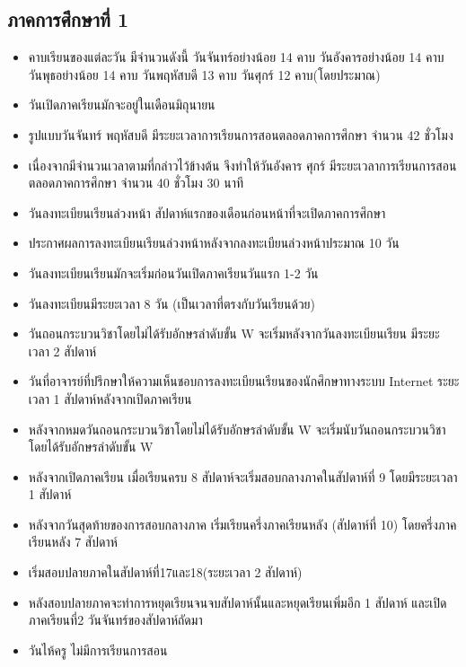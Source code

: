 \subsection{ภาคการศึกษาที่ 1}
 
\begin{itemize}
  \item   คาบเรียนของแต่ละวัน มีจำนวนดังนี้ วันจันทร์อย่างน้อย 14 คาบ วันอังคารอย่างน้อย 14 คาบ วันพุธอย่างน้อย 14 คาบ วันพฤหัสบดี 13 คาบ วันศุกร์ 12 คาบ(โดยประมาณ)  
  \item วันเปิดภาคเรียนมักจะอยู่ในเดือนมิถุนายน
  \item รูปแบบวันจันทร์ พฤหัสบดี มีระยะเวลาการเรียนการสอนตลอดภาคการศึกษา จำนวน 42 ชั่วโมง
  \item เนื่องจากมีจำนวนเวลาตามที่กล่าวไว้ข้างต้น จึงทำให้วันอังคาร ศุกร์ มีระยะเวลาการเรียนการสอนตลอดภาคการศึกษา จำนวน 40 ชั่วโมง 30 นาที 
  \item วันลงทะเบียนเรียนล่วงหน้า สัปดาห์แรกของเดือนก่อนหน้าที่จะเปิดภาคการศึกษา
  \item ประกาศผลการลงทะเบียนเรียนล่วงหน้าหลังจากลงทะเบียนล่วงหน้าประมาณ 10 วัน
  \item วันลงทะเบียนเรียนมักจะเริ่มก่อนวันเปิดภาคเรียนวันแรก 1-2 วัน
  \item วันลงทะเบียนมีระยะเวลา 8 วัน (เป็นเวลาที่ตรงกับวันเรียนด้วย)
  \item วันถอนกระบวนวิชาโดยไม่ได้รับอักษรลำดับขั้น W จะเริ่มหลังจากวันลงทะเบียนเรียน มีระยะเวลา 2 สัปดาห์
  \item วันที่อาจารย์ที่ปรึกษาให้ความเห็นชอบการลงทะเบียนเรียนของนักศึกษาทางระบบ Internet ระยะเวลา 1 สัปดาห์หลังจากเปิดภาคเรียน
  \item หลังจากหมดวันถอนกระบวนวิชาโดยไม่ได้รับอักษรลำดับขั้น W จะเริ่มนับวันถอนกระบวนวิชาโดยได้รับอักษรลำดับขั้น W
  \item หลังจากเปิดภาคเรียน เมื่อเรียนครบ 8 สัปดาห์จะเริ่มสอบกลางภาคในสัปดาห์ที่ 9 โดยมีระยะเวลา 1 สัปดาห์
  \item หลังจากวันสุดท้ายของการสอบกลางภาค เริ่มเรียนครึ่งภาคเรียนหลัง (สัปดาห์ที่ 10) โดยครึ่งภาคเรียนหลัง 7 สัปดาห์
  \item เริ่มสอบปลายภาคในสัปดาห์ที่17และ18(ระยะเวลา 2 สัปดาห์)
  \item หลังสอบปลายภาคจะทำการหยุดเรียนจนจบสัปดาห์นั้นและหยุดเรียนเพิ่มอีก 1 สัปดาห์ และเปิดภาคเรียนที่2 วันจันทร์ของสัปดาห์ถัดมา
  \item วันไห้ครู ไม่มีการเรียนการสอน
  
\end{itemize}


